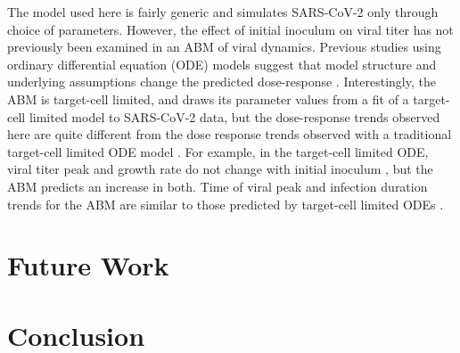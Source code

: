 The model used here is fairly generic and simulates SARS-CoV-2 only through choice of parameters. However, the effect of initial inoculum on viral titer has not previously been examined in an ABM of viral dynamics. Previous studies using ordinary differential equation (ODE) models suggest that model structure and underlying assumptions change the predicted dose-response \citep{wethington19, li14}. Interestingly, the ABM is target-cell limited, and draws its parameter values from a fit of a target-cell limited model to SARS-CoV-2 data, but the dose-response trends observed here are quite different from the dose response trends observed with a traditional target-cell limited ODE model \citep{wethington19,li14}. For example, in the target-cell limited ODE, viral titer peak and growth rate do not change with initial inoculum \citep{wethington19, li14}, but the ABM predicts an increase in both. Time of viral peak and infection duration trends for the ABM are similar to those predicted by target-cell limited ODEs \citep{wethington19, li14}.

\section{Future Work}
\section{Conclusion}

